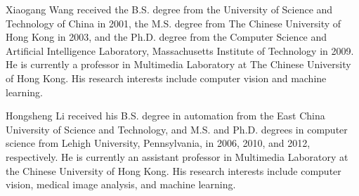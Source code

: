\documentclass[journal]{IEEEtran}
\begin{document}
\begin{IEEEbiography}{Xiaogang Wang}
received the B.S. degree from the University of Science and Technology of China in 2001, the M.S. degree from The Chinese University of Hong Kong in 2003, and the Ph.D. degree from the Computer Science and Artificial Intelligence Laboratory, Massachusetts Institute of Technology in 2009. He is currently a professor in Multimedia Laboratory at The Chinese University of Hong Kong. His research interests include computer vision and machine learning.
\end{IEEEbiography}

\begin{IEEEbiography}{Hongsheng Li}
received his B.S. degree in automation from the East China University of Science and Technology, and M.S. and Ph.D. degrees in computer science from Lehigh University, Pennsylvania, in 2006, 2010, and 2012, respectively. He is currently an assistant professor in Multimedia Laboratory at the Chinese University of Hong Kong. His research interests include computer vision, medical image analysis, and machine learning.
\end{IEEEbiography}
\end{document}
